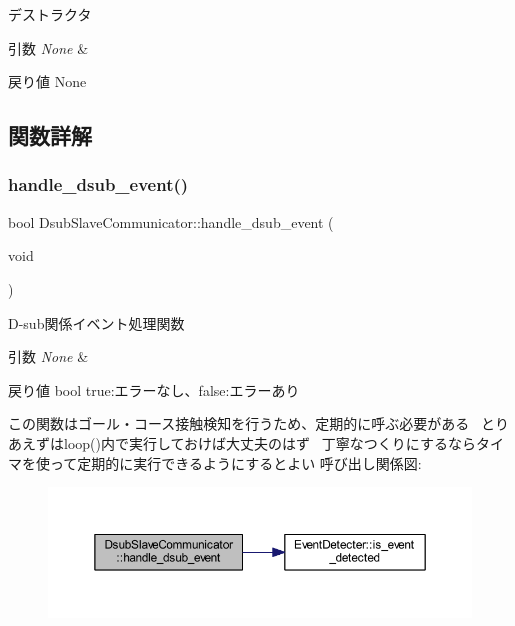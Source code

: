 デストラクタ 


\begin{DoxyParams}{引数}
{\em None} & \\
\hline
\end{DoxyParams}
\begin{DoxyReturn}{戻り値}
None 
\end{DoxyReturn}


\subsection{関数詳解}
\mbox{\label{class_dsub_slave_communicator_aef578741915e2e109b7b4d7813693cfe}} 
\subsubsection{\texorpdfstring{handle\_dsub\_event()}{handle\_dsub\_event()}}
{\footnotesize\ttfamily bool Dsub\+Slave\+Communicator\+::handle\+\_\+dsub\+\_\+event (\begin{DoxyParamCaption}\item[{void}]{ }\end{DoxyParamCaption})}



D-\/sub関係イベント処理関数 


\begin{DoxyParams}{引数}
{\em None} & \\
\hline
\end{DoxyParams}
\begin{DoxyReturn}{戻り値}
bool true\+:エラーなし、false\+:エラーあり
\end{DoxyReturn}
この関数はゴール・コース接触検知を行うため、定期的に呼ぶ必要がある~\newline
とりあえずはloop()内で実行しておけば大丈夫のはず~\newline
丁寧なつくりにするならタイマを使って定期的に実行できるようにするとよい 呼び出し関係図\+:
\nopagebreak
\begin{figure}[H]
\begin{center}
\leavevmode
\includegraphics[width=350pt]{class_dsub_slave_communicator_aef578741915e2e109b7b4d7813693cfe_cgraph}
\end{center}
\end{figure}
\mbox{\label{class_dsub_slave_communicator_a0bec7ba63d137c6b50b1c7f651792deb}} 
